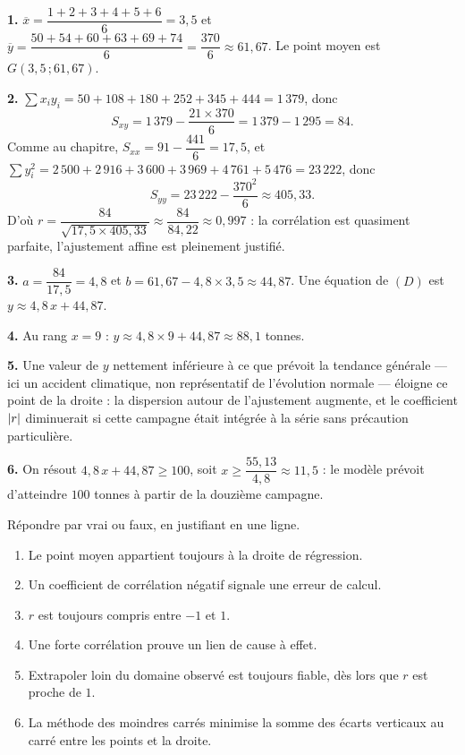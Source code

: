 \begin{corrige}
\textbf{1.} $\overline{x} = \dfrac{1+2+3+4+5+6}{6} = 3{,}5$ et
$\overline{y} = \dfrac{50+54+60+63+69+74}{6} = \dfrac{370}{6}
\approx 61{,}67$. Le point moyen est $G(3{,}5\,;61{,}67)$.

\textbf{2.} $\sum x_{i}y_{i} = 50+108+180+252+345+444 = 1\,379$, donc
\[
  S_{xy} = 1\,379-\frac{21 \times 370}{6} = 1\,379-1\,295 = 84 .
\]
Comme au chapitre, $S_{xx} = 91-\dfrac{441}{6} = 17{,}5$, et
$\sum y_{i}^{2} = 2\,500+2\,916+3\,600+3\,969+4\,761+5\,476 = 23\,222$, donc
\[
  S_{yy} = 23\,222-\frac{370^{2}}{6} \approx 405{,}33 .
\]
D'où
$r = \dfrac{84}{\sqrt{17{,}5 \times 405{,}33}}
\approx \dfrac{84}{84{,}22} \approx 0{,}997$ : la corrélation est quasiment
parfaite, l'ajustement affine est pleinement justifié.

\textbf{3.} $a = \dfrac{84}{17{,}5} = 4{,}8$ et
$b = 61{,}67-4{,}8 \times 3{,}5 \approx 44{,}87$. Une équation de $(D)$ est
$y \approx 4{,}8\,x+44{,}87$.

\textbf{4.} Au rang $x = 9$ :
$y \approx 4{,}8 \times 9+44{,}87 \approx 88{,}1$ tonnes.

\textbf{5.} Une valeur de $y$ nettement inférieure à ce que prévoit la
tendance générale — ici un accident climatique, non représentatif de
l'évolution normale — éloigne ce point de la droite : la dispersion autour de
l'ajustement augmente, et le coefficient $\left|r\right|$ diminuerait si cette
campagne était intégrée à la série sans précaution particulière.

\textbf{6.} On résout $4{,}8\,x+44{,}87 \geq 100$, soit
$x \geq \dfrac{55{,}13}{4{,}8} \approx 11{,}5$ : le modèle prévoit d'atteindre
$100$ tonnes à partir de la douzième campagne.
\end{corrige}

\begin{jemeteste}
Répondre par vrai ou faux, en justifiant en une ligne.

\begin{enumerate}[label=\textbf{\arabic*.}, leftmargin=*, itemsep=0.28em]
  \item Le point moyen appartient toujours à la droite de régression.
  \item Un coefficient de corrélation négatif signale une erreur de calcul.
  \item $r$ est toujours compris entre $-1$ et $1$.
  \item Une forte corrélation prouve un lien de cause à effet.
  \item Extrapoler loin du domaine observé est toujours fiable, dès lors que
        $r$ est proche de $1$.
  \item La méthode des moindres carrés minimise la somme des écarts
        verticaux au carré entre les points et la droite.
\end{enumerate}
\end{jemeteste}

